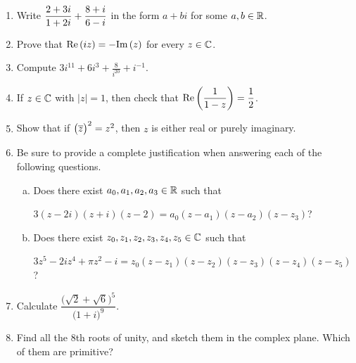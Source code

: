 \documentclass[11pt,fleqn,dvipsnames,usenames]{article}
\begin{document}
\begin{enumerate}
\item Write $\displaystyle{\frac{2 + 3i}{1 + 2i} + \frac{8+i}{6-i}}$ in the form $a+bi$ for some $a,b\in\mathbb{R}$.
\item Prove that $\text{Re}\left(iz\right) = -\text{Im}\left(z\right)$ for every $z\in\mathbb{C}$.
\item Compute $3i^{11} + 6i^{3} + \frac{8}{i^{20}} + i^{-1}$.
\item If $z\in\mathbb{C}$ with $|z| = 1$, then check that $\text{Re}\left(\dfrac{1}{1-z}\right) = \dfrac{1}{2}$.
\item Show that if $\big(\overline{z}\big)^2 = z^2$, then $z$ is either real or purely imaginary.
\item Be sure to provide a complete justification when answering each of the following questions.
\begin{enumerate}[(a)]
\item Does there exist $a_{0},a_{1},a_{2},a_{3}\in \mathbb{R}$ such that
\begin{center}
$3(z-2i)(z+i)(z-2) = a_{0}(z-a_{1})(z - a_{2})(z - z_{3})$?
\end{center}
\item Does there exist $z_{0},z_{1},z_{2},z_{3},z_{4},z_{5}\in \mathbb{C}$ such that
\begin{center}
$3z^5 - 2iz^4 + \pi z^2 - i = z_{0}(z - z_{1})(z - z_{2})(z - z_{3})(z - z_{4})(z - z_{5})$?
\end{center}
\end{enumerate}
\item Calculate $\dfrac{\big(\sqrt{2} + \sqrt{6}\big)^5}{\big(1+i\big)^9}$.
\item Find all the $8$th roots of unity, and sketch them in the complex plane.  Which of them are primitive?
\end{enumerate}
\end{document}
